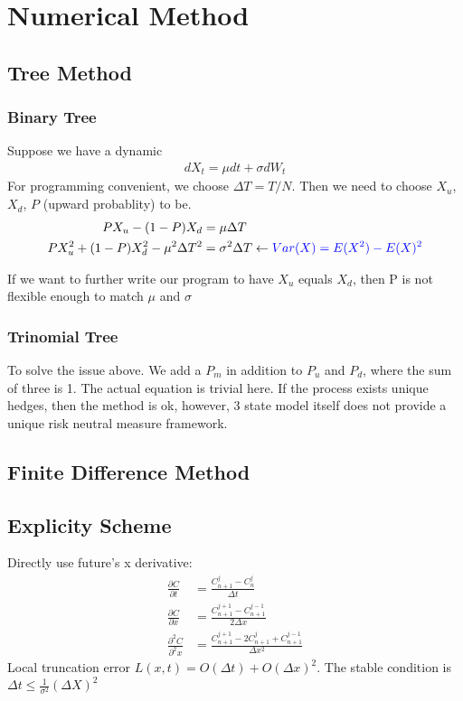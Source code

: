 \newpage
\section{Numerical Method}
\subsection{Tree Method}
\subsubsection{Binary Tree}
Suppose we have a dynamic
\begin{equation}
\begin{aligned}
dX_t = \mu dt + \sigma dW_t
\end{aligned}
\end{equation}
For programming convenient, we choose $\Delta T = T/N$. Then we need to choose
$X_u$, $X_d$, $P$ (upward probablity) to be.
\begin{equation}
\begin{aligned}
P X_u - (1-P) X_d &= \mu \Delta T \\
P X_u^2 + (1-P) X_d^2 -\mu^2 \Delta T ^2 &= \sigma^2 \Delta T \leftarrow {\color{blue}Var(X) = E(X^2) - E(X)^2} \\
\end{aligned}
\end{equation}

If we want to further write our program to have $X_u$ equals $X_d$, {\color{red} then P is not flexible enough to match $\mu$ and $\sigma$ }

\subsubsection{Trinomial Tree}
To solve the issue above. We add a $P_m$ in addition to $P_u$ and $P_d$, where the sum of three is 1. The actual equation is trivial here. If the process exists unique hedges, then the method is ok, however, 3 state model itself does not provide a unique risk neutral measure framework.

\subsection{Finite Difference Method}
\subsection{Explicity Scheme}
Directly use future's x derivative:
\begin{equation}
\begin{aligned}
\frac{\partial C}{\partial t} &= \frac{C^j_{n+1} - C^j_{n}}{\Delta t} \\
\frac{\partial C}{\partial x} &= \frac{C^{j+1}_{n+1} - C^{j-1}_{n+1}}{2 \Delta x}\\
\frac{\partial^2 C}{\partial^2 x} &= \frac{C^{j+1}_{n+1} -2C^{j}_{n+1}+ C^{j-1}_{n+1}}{\Delta x ^2}
\end{aligned}
\end{equation}
Local truncation error $L(x,t) = O(\Delta t) + O(\Delta x)^2$. The stable condition is $\Delta t \leq \frac{1}{\sigma^2} (\Delta X)^2$


